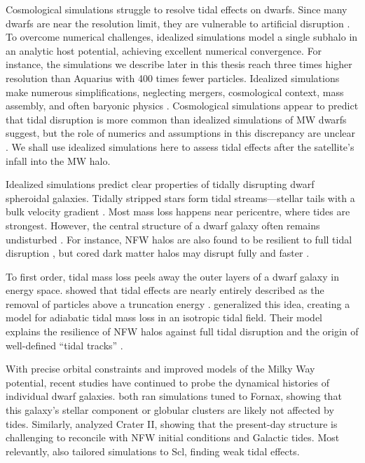 Cosmological simulations struggle to resolve tidal effects on dwarfs.
Since many dwarfs are near the resolution limit, they are vulnerable to
artificial disruption
\citep[e.g.,][]{vandenbosch+2018, santos-santos+2025}. To overcome
numerical challenges, idealized simulations model a single subhalo in an
analytic host potential, achieving excellent numerical convergence. For
instance, the simulations we describe later in this thesis reach three
times higher resolution than Aquarius \citep{springel+2008} with 400
times fewer particles. Idealized simulations make numerous
simplifications, neglecting mergers, cosmological context, mass
assembly, and often baryonic physics
\citep[e.g.,][]{hayashi+2003, bullock+johnston2005, klimentowski+2009, ogiya+2019}.
Cosmological simulations appear to predict that tidal disruption is more
common than idealized simulations of MW dwarfs suggest, but the role of
numerics and assumptions in this discrepancy are unclear
\citep{panithanpaisal+2021, shipp+2023, riley+2024}. We shall use
idealized simulations here to assess tidal effects after the satellite's
infall into the MW halo.

Idealized simulations predict clear properties of tidally disrupting
dwarf spheroidal galaxies. Tidally stripped stars form tidal
streams---stellar tails with a bulk velocity gradient
\citep[e.g.,][]{moore+davis1994, johnston+spergel+hernquist1995, read+2006}.
Most mass loss happens near pericentre, where tides are strongest.
However, the central structure of a dwarf galaxy often remains
undisturbed \citep{oh+lin+aarseth1995, piatek+pryor1995}. For instance,
NFW halos are also found to be resilient to full tidal disruption
\citep{EP2020}, but cored dark matter halos may disrupt fully and faster
\citep[e.g.,][]{penarrubia+2010, errani+2023a}.

To first order, tidal mass loss peels away the outer layers of a dwarf
galaxy in energy space.
\citet{drakos+taylor+benson2020, drakos+taylor+benson2022, amorisco2021}
showed that tidal effects are nearly entirely described as the removal
of particles above a truncation energy \citep[see
also][]{choi+weinberg+katz2009}. \citet{stucker+2023} generalized this
idea, creating a model for adiabatic tidal mass loss in an isotropic
tidal field. Their model explains the resilience of NFW halos against
full tidal disruption and the origin of well-defined ``tidal tracks''
\citep[as observed in][]{PNM2008, green+vandenbosch2019, EN2021}.

With precise orbital constraints and improved models of the Milky Way
potential, recent studies have continued to probe the dynamical
histories of individual dwarf galaxies.
\citet{battaglia+sollima+nipoti2015, borukhovetskaya+2022, dicintio+2024}
both ran simulations tuned to Fornax, showing that this galaxy's stellar
component or globular clusters are likely not affected by tides.
Similarly, \citet{borukhovetskaya+2022a} analyzed Crater II, showing
that the present-day structure is challenging to reconcile with NFW
initial conditions and Galactic tides. Most relevantly,
\citet{iorio+2019} also tailored simulations to Scl, finding weak tidal
effects.

